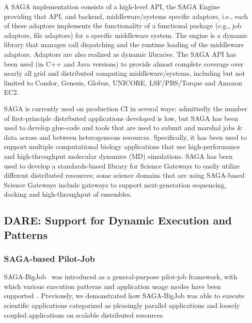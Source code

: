 \documentclass[]{svjour3}
\begin{document}
A SAGA implementation consists of a high-level API, the SAGA
Engine providing that API, and backend, middleware/systems specific
adaptors, i.e., each of these adaptors implements the functionality of
a functional package (e.g., job adaptors, file adaptors) for a
specific middleware system. The engine is a dynamic library that
manages call dispatching and the runtime loading of the middleware
adaptors. Adaptors are also realized as dynamic libraries. The SAGA
API has been used (in C++ and Java versions) to provide almost
complete coverage over nearly all grid and distributed computing
middleware/systems, including but not limited to Condor, Genesis,
Globus, UNICORE, LSF/PBS/Torque and Amazon EC2.

SAGA is currently used on production CI in several ways: admittedly
the number of first-principle distributed applications developed is
low, but SAGA has been used to develop glue-code and tools that are
used to submit and marshal jobs \& data across and between
heterogeneous resources. Specifically, it has been used to support
multiple computational biology applications that use high-performance
and high-throughput molecular dynamics (MD) simulations. SAGA has been
used to develop a standards-based library for Science Gateways to
easily utilize different distributed resources; some science domains
that are using SAGA-based Science Gateways include gateways to support
next-generation sequencing, docking and high-throughput of ensembles.

\subsection{DARE: Support for Dynamic Execution and Patterns}

\subsubsection{SAGA-based Pilot-Job}

SAGA-BigJob~\cite{saga-ccgrid10} was introduced as a general-purpose
pilot-job framework, with which various execution patterns and
application usage modes have been
supported~\cite{async_repex11,saga-royalsoc}. Previously, we
demonstrated how SAGA-BigJob was able to execute scientific
applications categorized as pleasingly parallel applications and
loosely coupled applications on scalable distributed
resources\cite{jha2009developing, ecmls10, ecmls11}


\end{document}
